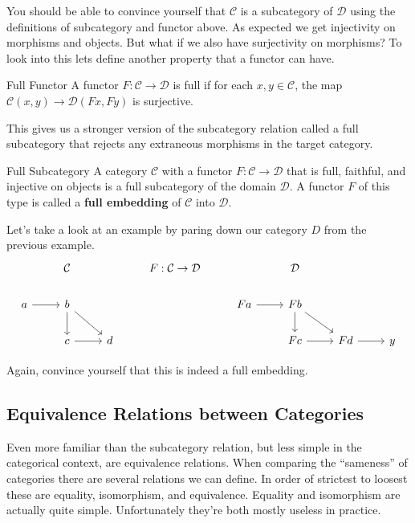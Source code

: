 \documentclass[12pt]{article}
\newcounter{examp}
\begin{document}
You should be able to convince yourself that $\mathcal{C}$ is a subcategory of $\mathcal{D}$ using the definitions of subcategory and functor above.
As expected we get injectivity on morphisms and objects.
But what if we also have surjectivity on morphisms?
To look into this lets define another property that a functor can have.

\begin{definition}{Full Functor}{}
    A functor $F:\mathcal{C}\rightarrow\mathcal{D}$ is full if for each $x,y\in\mathcal{C}$, the map $\mathcal{C}(x, y)\rightarrow\mathcal{D}(Fx,Fy)$ is surjective.
\end{definition}

This gives us a stronger version of the subcategory relation called a full subcategory that rejects any extraneous morphisms in the target category.

\begin{definition}{Full Subcategory}{}
    A category $\mathcal{C}$ with a functor $F:\mathcal{C}\rightarrow\mathcal{D}$ that is full, faithful, and injective on objects is a full subcategory of the domain $\mathcal{D}$.
    A functor $F$ of this type is called a \textbf{full embedding} of $\mathcal{C}$ into $\mathcal{D}$.
\end{definition}

Let's take a look at an example by paring down our category $D$ from the previous example.
\[\begin{tikzcd}
        & {\mathcal{C}} && {F:\mathcal{C}\rightarrow\mathcal{D}} && {\mathcal{D}} \\
        a & b &&& Fa & Fb \\
        & c & d &&& Fc & Fd & y
        \arrow[from=2-1, to=2-2]
        \arrow[from=2-2, to=3-2]
        \arrow[from=3-2, to=3-3]
        \arrow[from=2-2, to=3-3]
        \arrow[from=2-5, to=2-6]
        \arrow[from=2-6, to=3-7]
        \arrow[from=3-6, to=3-7]
        \arrow[from=2-6, to=3-6]
        \arrow[from=3-7, to=3-8]
    \end{tikzcd}\]

Again, convince yourself that this is indeed a full embedding.



\subsection*{Equivalence Relations between Categories}
Even more familiar than the subcategory relation, but less simple in the categorical context, are equivalence relations.
When comparing the ``sameness'' of categories there are several relations we can define.
In order of strictest to loosest these are equality, isomorphism, and equivalence.
Equality and isomorphism are actually quite simple.
Unfortunately they're both mostly useless in practice.
\end{document}
